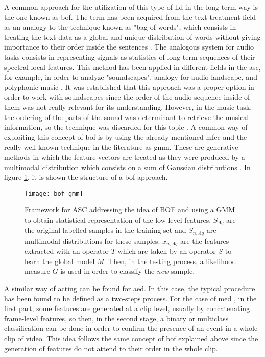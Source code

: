	A common approach for the utilization of this type of \acrshort{lld} in the long-term way is the one known as \acrfull{bof}. The term has been acquired from the text treatment field as an analogy to the technique known as "bag-of-words", which consists in treating the text data as a global and unique distribution of words without giving importance to their order inside the sentences \cite{Uijlings2009}. The analogous system for audio tasks consists in representing signals as statistics of long-term sequences of their spectral local features. This method has been applied in different fields in the \acrshort{asc}, for example, in order to analyze "soundscapes", analogy for audio landscape, and polyphonic music \cite{Aucouturier2007}. It was established that this approach was a proper option in order to work with soundscapes since the order of the audio sequence inside of them was not really relevant for its understanding. However, in the music task, the ordering of the parts of the sound was determinant to retrieve the musical information, so the technique was discarded for this topic \cite{Aucouturier2009}. A common way of exploiting this concept of \acrshort{bof} is by using the already mentioned \acrshort{mfcc} and the really well-known technique in the literature as \acrshort{gmm}. These are generative methods in which the feature vectors are treated as they were produced by a multimodal distribution which consists on a sum of Gaussian distributions \cite{Barchiesi2015}. In figure \ref{fig:mesh53}, it is shown the structure of a \acrlong{bof} approach. 
	
	\begin{figure}[H]
		\centering
		\captionsetup{justification=centering}
		\texttt{[image: bof-gmm]}
		\caption{Framework for ASC addressing the idea of BOF and using a GMM to obtain statistical representation of the low-level features. $S_{\Lambda q} $ are the original labelled samples in the training set and $S_{n,\Lambda q}$ are multimodal distributions for these samples. $x_{n,\Lambda q}$ are the features extracted with an operator $T$ which are taken by an operator $S$ to learn the global model $M$. Then, in the testing process, a likelihood measure $G$ is used in order to classify the \textit{new} sample.}
		\label{fig:mesh53}
	\end{figure}
	
	A similar way of acting can be found for \acrshort{aed}. In this case, the typical procedure has been found to be defined as a two-steps process. For the case of \acrfull{med} \cite{Wang2016}, in the first part, some features are generated at a clip level, usually by concatenating frame-level features, so then, in the second stage, a binary or multiclass classification can be done in order to confirm the presence of an event in a whole clip of video. This idea follows the same concept of \acrshort{bof} explained above since the generation of features do not attend to their order in the whole clip.
	
